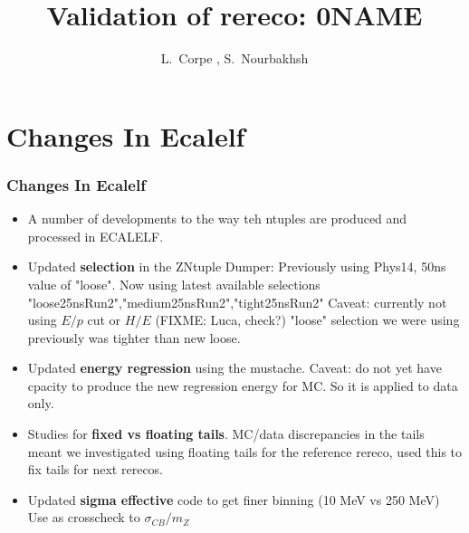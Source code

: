\documentclass[8pt,serif]{beamer}
\title{Validation of rereco: 0NAME}
\author{L.~Corpe \inst{1}, S.~Nourbakhsh \inst{2}}
\institute[shortinst]{\inst{1} Imperial College London \and %
                      \inst{2} University of Minnesota}
\begin{document}
\begin{frame}
\titlepage
\end{frame}
\begin{frame}
\tableofcontents
\end{frame}
\usebackgroundtemplate{
	\texttt{[image: ]}%
}

\color{titlecolor}
\section{Changes In Ecalelf}
\begin{frame}
\frametitle{Changes In Ecalelf}

\vspace{10mm}

\begin{itemize}
\item A number of developments to the way teh ntuples are produced and processed in ECALELF.
\item Updated \textbf{selection} in the ZNtuple Dumper:
\subitem Previously using Phys14, 50ns value of "loose".
\subitem Now using latest available selections "loose25nsRun2","medium25nsRun2","tight25nsRun2"
\subitem Caveat: currently not using $E/p$ cut or $H/E$ (FIXME: Luca, check?)
\subitem "loose" selection we were using previously was tighter than new loose. 
\item Updated \textbf{energy regression} using the mustache.
\subitem Caveat: do not yet have cpacity to produce the new regression energy for MC. So it is applied to data only.
\item Studies for \textbf{fixed vs floating tails}. MC/data discrepancies in the tails meant we investigated using floating tails for the reference rereco, used this to fix tails for next rerecos.
\item Updated \textbf{sigma effective} code to get finer binning (10 MeV vs 250 MeV)
\subitem Use as crosscheck to $\sigma_{CB}/m_{Z}$
\end{itemize}
\end{frame}
\end{document}
